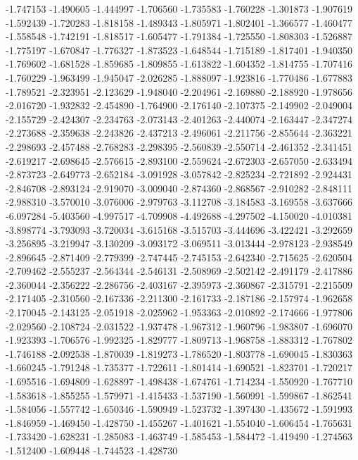 -1.747153
-1.490605
-1.444997
-1.706560
-1.735583
-1.760228
-1.301873
-1.907619
-1.592439
-1.720283
-1.818158
-1.489343
-1.805971
-1.802401
-1.366577
-1.460477
-1.558548
-1.742191
-1.818517
-1.605477
-1.791384
-1.725550
-1.808303
-1.526887
-1.775197
-1.670847
-1.776327
-1.873523
-1.648544
-1.715189
-1.817401
-1.940350
-1.769602
-1.681528
-1.859685
-1.809855
-1.613822
-1.604352
-1.814755
-1.707416
-1.760229
-1.963499
-1.945047
-2.026285
-1.888097
-1.923816
-1.770486
-1.677883
-1.789521
-2.323951
-2.123629
-1.948040
-2.204961
-2.169880
-2.188920
-1.978656
-2.016720
-1.932832
-2.454890
-1.764900
-2.176140
-2.107375
-2.149902
-2.049004
-2.155729
-2.424307
-2.234763
-2.073143
-2.401263
-2.440074
-2.163447
-2.347274
-2.273688
-2.359638
-2.243826
-2.437213
-2.496061
-2.211756
-2.855644
-2.363221
-2.298693
-2.457488
-2.768283
-2.298395
-2.560839
-2.550714
-2.461352
-2.341451
-2.619217
-2.698645
-2.576615
-2.893100
-2.559624
-2.672303
-2.657050
-2.633494
-2.873723
-2.649773
-2.652184
-3.091928
-3.057842
-2.825234
-2.721892
-2.924431
-2.846708
-2.893124
-2.919070
-3.009040
-2.874360
-2.868567
-2.910282
-2.848111
-2.988310
-3.570010
-3.076006
-2.979763
-3.112708
-3.184583
-3.169558
-3.637666
-6.097284
-5.403560
-4.997517
-4.709908
-4.492688
-4.297502
-4.150020
-4.010381
-3.898774
-3.793093
-3.720034
-3.615168
-3.515703
-3.444696
-3.422421
-3.292659
-3.256895
-3.219947
-3.130209
-3.093172
-3.069511
-3.013444
-2.978123
-2.938549
-2.896645
-2.871409
-2.779399
-2.747445
-2.745153
-2.642340
-2.715625
-2.620504
-2.709462
-2.555237
-2.564344
-2.546131
-2.508969
-2.502142
-2.491179
-2.417886
-2.360044
-2.356222
-2.286756
-2.403167
-2.395973
-2.360867
-2.315791
-2.215509
-2.171405
-2.310560
-2.167336
-2.211300
-2.161733
-2.187186
-2.157974
-1.962658
-2.170045
-2.143125
-2.051918
-2.025962
-1.953363
-2.010892
-2.174666
-1.977806
-2.029560
-2.108724
-2.031522
-1.937478
-1.967312
-1.960796
-1.983807
-1.696070
-1.923393
-1.706576
-1.992325
-1.829777
-1.809713
-1.968758
-1.883312
-1.767802
-1.746188
-2.092538
-1.870039
-1.819273
-1.786520
-1.803778
-1.690045
-1.830363
-1.660245
-1.791248
-1.735377
-1.722611
-1.801414
-1.690521
-1.823701
-1.720217
-1.695516
-1.694809
-1.628897
-1.498438
-1.674761
-1.714234
-1.550920
-1.767710
-1.583618
-1.855255
-1.579971
-1.415433
-1.537190
-1.560991
-1.599867
-1.862541
-1.584056
-1.557742
-1.650346
-1.590949
-1.523732
-1.397430
-1.435672
-1.591993
-1.846959
-1.469450
-1.428750
-1.455267
-1.401621
-1.554040
-1.606454
-1.765631
-1.733420
-1.628231
-1.285083
-1.463749
-1.585453
-1.584472
-1.419490
-1.274563
-1.512400
-1.609448
-1.744523
-1.428730

